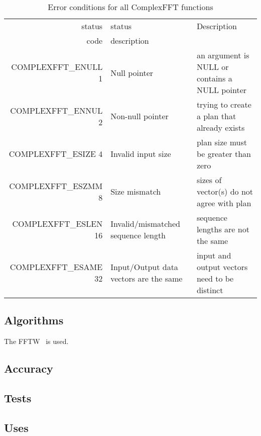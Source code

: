 \documentclass{article}
\begin{document}
\begin{table}
\begin{tabular}{|r|l|p{2in}|}\hline
status  & status          & Description\\
code    & description     & \\\hline
COMPLEXFFT\_ENULL 1   & Null pointer
  & an argument is NULL or contains a NULL pointer\\
COMPLEXFFT\_ENNUL 2   & Non-null pointer
  & trying to create a plan that already exists \\
COMPLEXFFT\_ESIZE 4   & Invalid input size
  & plan size must be greater than zero\\
COMPLEXFFT\_ESZMM 8   & Size mismatch
  & sizes of vector(s) do not agree with plan\\
COMPLEXFFT\_ESLEN 16  & Invalid/mismatched sequence length
  & sequence lengths are not the same\\
COMPLEXFFT\_ESAME 32  & Input/Output data vectors are the same
  & input and output vectors need to be distinct\\
\hline
\end{tabular}
\caption{Error conditions for all ComplexFFT functions}\label{tbl:CV}
\end{table}
                                
\subsection{Algorithms}

The FFTW~\cite{fj:1998} is used.


\subsection{Accuracy}



\subsection{Tests}


\subsection{Uses}
\end{document}
